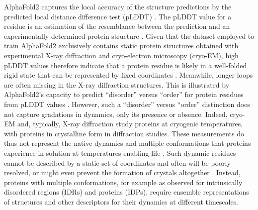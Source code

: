 AlphaFold2 captures the local accuracy of the structure predictions by the predicted local distance difference test (pLDDT) \cite{mariani_lddt_2013, jumper_highly_2021}. The pLDDT value for a residue is an estimation of the resemblance between the prediction and an experimentally determined protein structure \cite{varadi_alphafold_2021}. Given that the dataset employed to train AlphaFold2 exclusively contains static protein structures \cite{jumper_highly_2021} obtained with experimental X-ray diffraction and cryo-electron microscopy (cryo-EM), high pLDDT values therefore indicate that a protein residue is likely in a well-folded rigid state that can be represented by fixed coordinates \cite{noauthor_alphafold_nodate}. Meanwhile, longer loops are often missing in the X-ray diffraction structures. This is illustrated by AlphaFold2's capacity to predict ``disorder'' versus ``order'' for protein residues from pLDDT values \cite{piovesan_intrinsic_2022}. However, such a ``disorder'' versus ``order'' distinction does not capture gradations in dynamics, only its presence or absence. Indeed, cryo-EM and, typically, X-ray diffraction study proteins at cryogenic temperatures, with proteins in crystalline form in diffraction studies. These measurements do thus not represent the native dynamics and multiple conformations that proteins experience in solution at temperatures enabling life \cite{fenwick_integrated_2014}. Such dynamic residues cannot be described by a static set of coordinates and often will be poorly resolved, or might even prevent the formation of crystals altogether \cite{van_den_bedem_integrative_2015}. Instead, proteins with multiple conformations, for example as observed for intrinsically disordered regions (IDRs) and proteins (IDPs), require ensemble representations of structures \cite{varadi_pe-db_2014} and other descriptors for their dynamics at different timescales.

